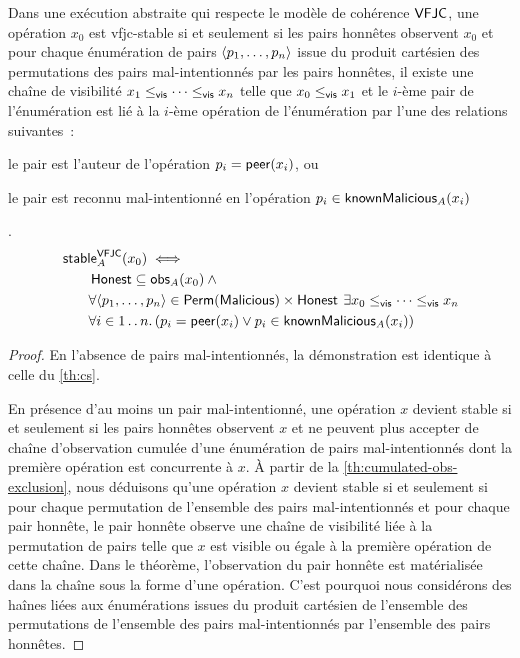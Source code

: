 \begin{theorem}\label{th:vfjc-stable}
Dans une exécution abstraite qui respecte le modèle de cohérence $\trm{VFJC}$, une opération $x_0$ est vfjc-stable si et seulement si les pairs honnêtes observent $x_0$ et pour chaque énumération de pairs $\tuple*{p_1, \dotsc, p_n}$ issue du produit cartésien des permutations des pairs mal-intentionnés par les pairs honnêtes, il existe une chaîne de visibilité $x_1 \viseq \dotsb \viseq x_n$ telle que $x_0 \viseq x_1$ et le $i$-ème pair de l'énumération est lié à la $i$-ème opération de l'énumération par l'une des relations suivantes~: \begin{inlinelist}
    \item le pair est l'auteur de l'opération $p_i = \trm{peer}(x_i)$, ou
    \item le pair est reconnu mal-intentionné en l'opération $p_i \in \trm{knownMalicious}_A(x_i)$
\end{inlinelist}.
\begin{equation*}\begin{split}
\MoveEqLeft\trm{stable}_A^{\trm{VFJC}}(x_0) \iff \\
    &\trm{Honest} \subseteq \trm{obs}_A(x_0) \:\land \\
    &\forall \tuple*{p_1,\dotsc, p_n} \in \trm{Perm}(\trm{Malicious}) \times \trm{Honest} \:\exists x_0 \viseq \dotsb \viseq x_n\\
    &\forall i \in \irange{1}{n} \qsep (p_i = \trm{peer}(x_i) \lor p_i \in \trm{knownMalicious}_A(x_i))
\end{split}\end{equation*}
\end{theorem}

\begin{proof}
En l'absence de pairs mal-intentionnés, la démonstration est identique à celle du \autoref{th:cs}.

En présence d'au moins un pair mal-intentionné, une opération $x$ devient stable si et seulement si les pairs honnêtes observent $x$ et ne peuvent plus accepter de chaîne d'observation cumulée d'une énumération de pairs mal-intentionnés dont la première opération est concurrente à $x$.
À partir de la \autoref{th:cumulated-obs-exclusion}, nous déduisons qu'une opération $x$ devient stable si et seulement si pour chaque permutation de l'ensemble des pairs mal-intentionnés et pour chaque pair honnête, le pair honnête observe une chaîne de visibilité liée à la permutation de pairs telle que $x$ est visible ou égale à la première opération de cette chaîne.
Dans le théorème, l'observation du pair honnête est matérialisée dans la chaîne sous la forme d'une opération.
C'est pourquoi nous considérons des haînes liées aux énumérations issues du produit cartésien de l'ensemble des permutations de l'ensemble des pairs mal-intentionnés par l'ensemble des pairs honnêtes.
\end{proof}


